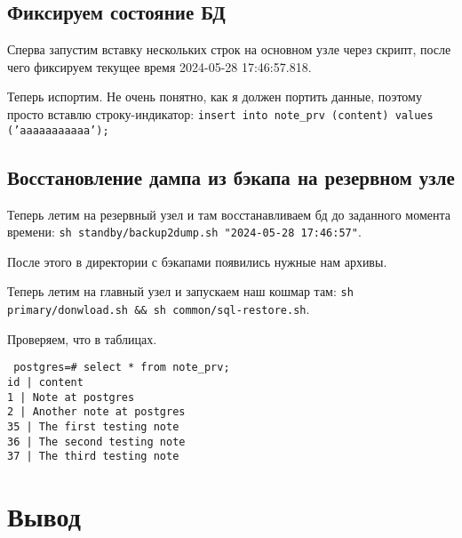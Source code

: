 \documentclass{article}
\begin{document}
\subsection{Фиксируем состояние БД}

Сперва запустим вставку нескольких строк на основном узле через скрипт, после чего фиксируем текущее время 2024-05-28 17:46:57.818.



Теперь испортим. Не очень понятно, как я должен портить данные, поэтому просто вставлю строку-индикатор: \texttt{insert into note\_prv (content) values ('aaaaaaaaaaa');
}

\subsection{Восстановление дампа из бэкапа на резервном узле}

Теперь летим на резервный узел и там восстанавливаем бд до заданного момента времени: \texttt{sh standby/backup2dump.sh "2024-05-28 17:46:57"}.





После этого в директории с бэкапами появились нужные нам архивы. 

Теперь летим на главный узел и запускаем наш кошмар там: \texttt{sh primary/donwload.sh \&\& sh common/sql-restore.sh}.



Проверяем, что в таблицах.

\texttt{
postgres=\# select * from note\_prv;\\
 id |         content          \\
  1 | Note at postgres\\
  2 | Another note at postgres\\
 35 | The first testing note\\
 36 | The second testing note\\
 37 | The third testing note
}

\section{Вывод}
\end{document}
